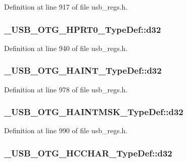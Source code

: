 Definition at line 917 of file usb\-\_\-regs.\-h.

\hypertarget{group___u_s_b___o_t_g___d_r_i_v_e_r_ga12e80fae082acbf526a1042c213b9a2b}{
\subsubsection[{d32}]{ \-\_\-\-U\-S\-B\-\_\-\-O\-T\-G\-\_\-\-H\-P\-R\-T0\-\_\-\-Type\-Def\-::d32}}\label{group___u_s_b___o_t_g___d_r_i_v_e_r_ga12e80fae082acbf526a1042c213b9a2b}


Definition at line 940 of file usb\-\_\-regs.\-h.

\hypertarget{group___u_s_b___o_t_g___d_r_i_v_e_r_gaf31801d9033db4be2c72b0ca2f2f017b}{
\subsubsection[{d32}]{ \-\_\-\-U\-S\-B\-\_\-\-O\-T\-G\-\_\-\-H\-A\-I\-N\-T\-\_\-\-Type\-Def\-::d32}}\label{group___u_s_b___o_t_g___d_r_i_v_e_r_gaf31801d9033db4be2c72b0ca2f2f017b}


Definition at line 978 of file usb\-\_\-regs.\-h.

\hypertarget{group___u_s_b___o_t_g___d_r_i_v_e_r_ga8c38bda0e50eba179a611f7e1f6458d9}{
\subsubsection[{d32}]{ \-\_\-\-U\-S\-B\-\_\-\-O\-T\-G\-\_\-\-H\-A\-I\-N\-T\-M\-S\-K\-\_\-\-Type\-Def\-::d32}}\label{group___u_s_b___o_t_g___d_r_i_v_e_r_ga8c38bda0e50eba179a611f7e1f6458d9}


Definition at line 990 of file usb\-\_\-regs.\-h.

\hypertarget{group___u_s_b___o_t_g___d_r_i_v_e_r_ga0a0a2fc3e4194e8dd800311c652a6391}{
\subsubsection[{d32}]{ \-\_\-\-U\-S\-B\-\_\-\-O\-T\-G\-\_\-\-H\-C\-C\-H\-A\-R\-\_\-\-Type\-Def\-::d32}}\label{group___u_s_b___o_t_g___d_r_i_v_e_r_ga0a0a2fc3e4194e8dd800311c652a6391}


